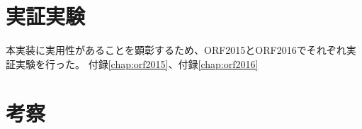 
\section{実証実験}
本実装に実用性があることを顕彰するため、ORF2015とORF2016でそれぞれ実証実験を行った。
付録\ref{chap:orf2015}、付録\ref{chap:orf2016}

\section{考察}
